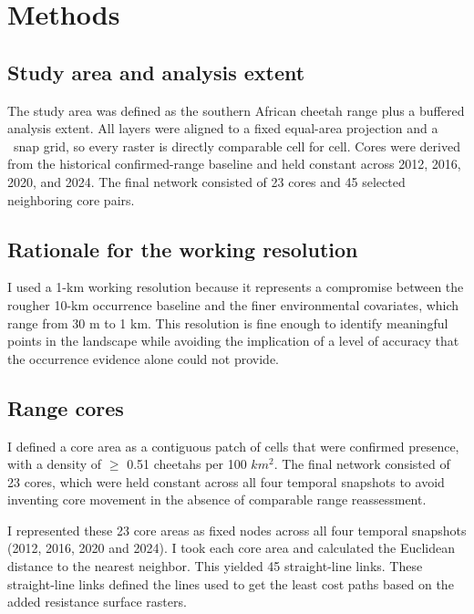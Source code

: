 \section{Methods}
\label{sec:methods}

\subsection{Study area and analysis extent}
\label{sec:extent}

The study area was defined as the southern African cheetah range  plus a buffered analysis extent. All layers were aligned to a fixed equal-area projection and a \cellsize\ snap grid, so every raster is directly comparable cell for cell. Cores were derived from the historical confirmed-range baseline and held constant across 2012, 2016, 2020, and 2024. The final network consisted of 23 cores and 45 selected neighboring core pairs.

\subsection{Rationale for the working resolution}
\label{sec:scale}

I used a 1-km working resolution because it represents a compromise between the rougher 10-km occurrence baseline and the finer environmental covariates, which range from 30 m to 1 km. This resolution is fine enough to identify meaningful points in the landscape while avoiding the implication of a level of accuracy that the occurrence evidence alone could not provide.

\subsection{Range cores}
\label{sec:cores}

I defined a core area as a contiguous patch of cells that were confirmed presence, with a density of $\geq$ 0.51 cheetahs per 100 $km^2$. The final network consisted of 23 cores, which were held constant across all four temporal snapshots to avoid inventing core movement in the absence of comparable range reassessment.

I represented these 23 core areas as fixed nodes across all four temporal snapshots (2012, 2016, 2020 and 2024). I took each core area and calculated the Euclidean distance to the nearest neighbor. This yielded 45 straight-line links. These straight-line links defined the lines used to get the least cost paths based on the added resistance surface rasters.

